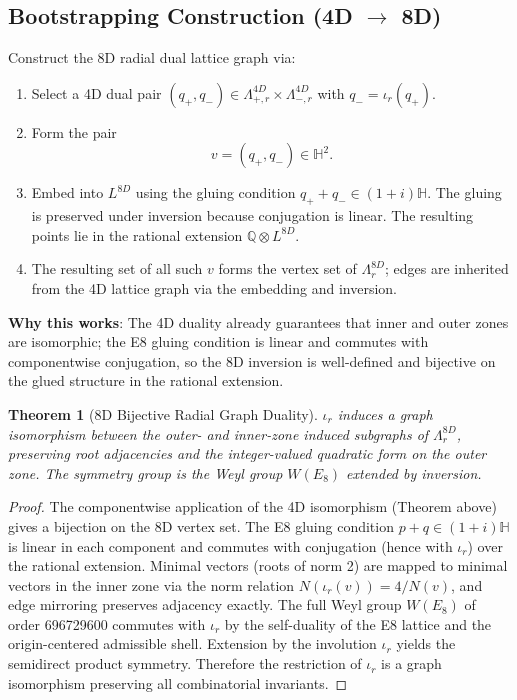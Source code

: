 \documentclass{article}
\newtheorem{theorem}{Theorem}
\begin{document}
\subsection{Bootstrapping Construction (4D \(\to\) 8D)}
Construct the 8D radial dual lattice graph via:
\begin{enumerate}
  \item Select a 4D dual pair \((q_+, q_-) \in \Lambda_{+,r}^{4D} \times \Lambda_{-,r}^{4D}\) with \(q_- = \iota_r(q_+)\).
  \item Form the pair
        \[
        v = (q_+, q_-) \in \mathbb{H}^2.
        \]
  \item Embed into \(L^{8D}\) using the gluing condition \(q_+ + q_- \in (1+i)\mathbb{H}\). The gluing is preserved under inversion because conjugation is linear. The resulting points lie in the rational extension \(\mathbb{Q} \otimes L^{8D}\).
  \item The resulting set of all such \(v\) forms the vertex set of \(\Lambda_r^{8D}\); edges are inherited from the 4D lattice graph via the embedding and inversion.
\end{enumerate}
\textbf{Why this works}: The 4D duality already guarantees that inner and outer zones are isomorphic; the E8 gluing condition is linear and commutes with componentwise conjugation, so the 8D inversion is well-defined and bijective on the glued structure in the rational extension.
\begin{theorem}[8D Bijective Radial Graph Duality]
\label{thm:8d-duality}
\(\iota_r\) induces a graph isomorphism between the outer- and inner-zone induced subgraphs of \(\Lambda_r^{8D}\), preserving root adjacencies and the integer-valued quadratic form on the outer zone. The symmetry group is the Weyl group \(W(E_8)\) extended by inversion.
\end{theorem}
\begin{proof}
The componentwise application of the 4D isomorphism (Theorem above) gives a bijection on the 8D vertex set. The E8 gluing condition \(p + q \in (1+i)\mathbb{H}\) is linear in each component and commutes with conjugation (hence with \(\iota_r\)) over the rational extension. Minimal vectors (roots of norm 2) are mapped to minimal vectors in the inner zone via the norm relation \(N(\iota_r(v)) = 4/N(v)\), and edge mirroring preserves adjacency exactly. The full Weyl group \(W(E_8)\) of order 696729600 commutes with \(\iota_r\) by the self-duality of the E8 lattice and the origin-centered admissible shell. Extension by the involution \(\iota_r\) yields the semidirect product symmetry. Therefore the restriction of \(\iota_r\) is a graph isomorphism preserving all combinatorial invariants.
\end{proof}
\end{document}
